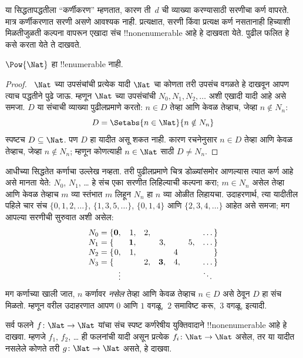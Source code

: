 \documentclass[../../../include/open-logic-section]{subfiles}
\begin{document}
\begin{explain}
या सिद्धतापद्धतीला ``कर्णीकरण'' म्हणतात, कारण ती~$d$ ची व्याख्या
करण्यासाठी सरणीचा कर्ण वापरते. मात्र कर्णीकरणात सरणी असणे आवश्यक नाही.
प्रत्यक्षात, सरणी किंवा प्रत्यक्ष कर्ण नसतानाही हिच्याशी मिळतीजुळती कल्पना
वापरून एखादा संच !!{nonenumerable} आहे हे दाखवता येते. पुढील फलित हे
कसे करता येते ते दाखवते.
\end{explain}

\begin{thm}
$\Pow{\Nat}$ हा !!{enumerable} नाही.
\end{thm}

\begin{proof}
~$\Nat$ च्या उपसंचांची प्रत्येक यादी $\Nat$ चा कोणता तरी उपसंच वगळते
हे दाखवून आपण त्याच पद्धतीने पुढे जाऊ. म्हणून $\Nat$ च्या उपसंचांची
$N_0, N_1, N_2, \ldots$ अशी एखादी यादी आहे असे समजा. $D$ या संचाची
व्याख्या पुढीलप्रमाणे करतो: $n \in D$ तेव्हा आणि केवळ तेव्हाच, जेव्हा
$n \notin N_{n}$:
\[
D = \Setabs{n \in \Nat}{n \notin N_n}
\]
स्पष्टच $D\subseteq \Nat$. पण $D$ हा यादीत असू शकत नाही. कारण
रचनेनुसार $n \in D$ तेव्हा आणि केवळ तेव्हाच, जेव्हा $n\notin N_n$;
म्हणून कोणत्याही $n \in \Nat$ साठी $D \neq N_n$.
\end{proof}

\begin{explain}
आधीच्या सिद्धतेत कर्णाचा उल्लेख नव्हता. तरी पुढीलप्रमाणे चित्र डोळ्यांसमोर
आणल्यास त्यात कर्ण आहे असे मानता येते: $N_0$, $N_1$, \dots{} हे संच
एका सरणीत लिहिल्याची कल्पना करा; $m \in N_n$ असेल तेव्हा आणि केवळ
तेव्हाच $m$ व्या स्तंभात $m$ लिहून $N_n$ हा $n$ व्या ओळीत लिहायचा.
उदाहरणार्थ, त्या यादीतील पहिले चार संच $\{0,1,2,\dots\}$,
$\{1, 3, 5, \dots\}$, $\{0,1,4\}$ आणि $\{2,3,4,\dots\}$ आहेत असे
समजा; मग आपल्या सरणीची सुरुवात अशी असेल:
\[
\begin{array}{r@{}rrrrrrr}
  N_0 = \{ & \mathbf{0}, & 1, & 2, & & & & \dots\}\\
  N_1 = \{ &  & \mathbf{1}, &  & 3, &  & 5, & \dots\}\\
  N_2 = \{ & 0, & 1, &  &  & 4\phantom{,} &  & \}\\
  N_3 = \{ &  &  & 2, & \mathbf{3}, & 4, & & \dots\}\\
  &\vdots & & & & & & \ddots\phantom{\}}
  \end{array}
\]
मग कर्णाच्या खाली जात, $n$ कर्णावर \emph{नसेल} तेव्हा आणि केवळ
तेव्हाच $n \in D$ असे ठेवून $D$ हा संच मिळतो. म्हणून वरील उदाहरणात
आपण $0$ आणि $1$ वगळू,~$2$ समाविष्ट करू,~$3$ वगळू, इत्यादी.
\end{explain}

\begin{prob}
सर्व फलने $f \colon \Nat \to \Nat$ यांचा संच स्पष्ट कर्णरेषीय
युक्तिवादाने !!{nonenumerable} आहे हे दाखवा. म्हणजे $f_1$, $f_2$,
\dots{} ही फलनांची यादी असून प्रत्येक $f_i\colon \Nat \to \Nat$
असेल, तर या यादीत नसलेले कोणते तरी $g \colon \Nat \to \Nat$ असते,
हे दाखवा.
\end{prob}
\end{document}
